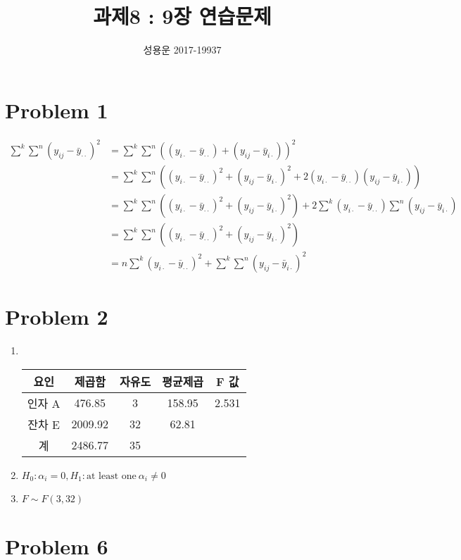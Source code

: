 \documentclass{article}
\title{과제8 : 9장 연습문제}
\author{성용운 2017-19937}
\date{}
\begin{document}
\maketitle

\section*{Problem 1}

\begin{align*}
	\sum^k \sum^n (y_{ij} - \bar{y}_{\cdot\cdot})^2
	&= \sum^k \sum^n (
		(y_{i\cdot} - \bar{y}_{\cdot\cdot}) +
		(y_{ij} - \bar{y}_{i\cdot})
	)^2 \\
	&= \sum^k \sum^n (
		(y_{i\cdot} - \bar{y}_{\cdot\cdot})^2 +
		(y_{ij} - \bar{y}_{i\cdot})^2 +
		2(y_{i\cdot} - \bar{y}_{\cdot\cdot})
		(y_{ij} - \bar{y}_{i\cdot})
	) \\
	&= \sum^k \sum^n (
		(y_{i\cdot} - \bar{y}_{\cdot\cdot})^2 +
		(y_{ij} - \bar{y}_{i\cdot})^2
	) +
		2 \sum^k (y_{i\cdot} - \bar{y}_{\cdot\cdot})
		\sum^n (y_{ij} - \bar{y}_{i\cdot})
	\\
	&= \sum^k \sum^n (
		(y_{i\cdot} - \bar{y}_{\cdot\cdot})^2 +
		(y_{ij} - \bar{y}_{i\cdot})^2
	) \\
	&=
	n \sum^k (y_{i\cdot} - \bar{y}_{\cdot\cdot})^2 +
	\sum^k \sum^n (y_{ij} - \bar{y}_{i\cdot})^2
\end{align*}

\section*{Problem 2}

\begin{enumerate}
	\item ~
		\begin{center}
		\begin{tabular}{c|cccc}
			요인 & 제곱함 & 자유도 & 평균제곱 & F 값 \\
			\hline
			인자 A & 476.85  & 3  & 158.95 & 2.531 \\
			잔차 E & 2009.92 & 32 & 62.81 \\
			\hline
			계& 2486.77 & 35 &
		\end{tabular}
		\end{center}
	\item $H_0: \alpha_i = 0, H_1: \text{at least one}\ \alpha_i \ne 0$
	\item $F \sim F(3, 32)$
\end{enumerate}

\section*{Problem 6}
\end{document}
